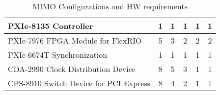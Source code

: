 \begin{landscape}
\begin{table}[h]
\begin{center}
\begin{tabular}{|l|c|c|c|c|c|}
                        PXIe-8135 Controller                                                                                 & 1                                                                              & 1                                                                             & 1                                                                             & 1                                                                             & 1                                                                            \\ \hline
                        PXIe-7976 FPGA Module for FlexRIO                                                                    & 5                                                                              & 3                                                                             & 2                                                                             & 2                                                                             & 2                                                                            \\ \hline
                        PXIe-6674T Synchronization                                                                           & 1                                                                              & 1                                                                             & 1                                                                             & 1                                                                             & 1                                                                            \\ \hline
                        CDA-2990 Clock Distribution Device                                                                   & 8                                                                              & 5                                                                             & 3                                                                             & 1                                                                             & 1                                                                            \\ \hline
                        CPS-8910 Switch Device for PCI Express                                                               & 8                                                                              & 4                                                                             & 2                                                                             & 1                                                                             & 1                                                                            \\ \hline
        \end{tabular}
        \caption{MIMO Configurations and HW requirements}
        \label{tb:MIMOAFWConf}
    \end{center}
\end{table}
\end{landscape}

